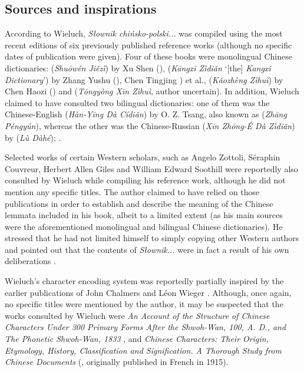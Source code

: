 \documentclass[output=paper,colorlinks,citecolor=brown,arabicfont,chinesefont]{langscibook}
\begin{document}
\subsection{Sources and inspirations}

According to Wieluch, \emph{Słownik chińsko-polski...} was compiled using the most recent editions of six previously published reference works (although no specific dates of publication were given). Four of these books were monolingual Chinese dictionaries: {} (\emph{Shuōwén Jiězì}) by Xu Shen ({}), {} (\emph{Kāngxī Zìdiǎn} ‘[the] \emph{Kangxi Dictionary}’) by Zhang Yushu ({}), Chen Tingjing {}) et al., {} (\emph{Kǎozhèng Zìhuì}) by Chen Haozi ({}) and {} (\emph{Tōngyòng Xīn Zìhuì}, author uncertain). In addition, Wieluch claimed to have consulted two bilingual dictionaries: one of them was the Chinese-English {} (\emph{Hàn-Yīng Dà Cídiǎn}) by O. Z. Tsang, also known as {} (\emph{Zhāng Péngyún}), whereas the other was the Chinese-Russian {} (\emph{Xīn Zhōng-É Dà Zìdiǎn}) by {} (\emph{Lù Dàhé}); \citep[14\textsubscript{p}]{Wieluch1936}.

Selected works of certain Western scholars, such as Angelo Zottoli, Séraphin Couvreur, Herbert Allen Giles and William Edward Soothill were reportedly also consulted by Wieluch while compiling his reference work, although he did not mention any specific titles. The author claimed to have relied on those publications in order to establish and describe the meaning of the Chinese lemmata included in his book, albeit to a limited extent (as his main sources were the aforementioned monolingual and bilingual Chinese dictionaries). He stressed that he had not limited himself to simply copying other Western authors and pointed out that the contents of \emph{Słownik...} were in fact a result of his own deliberations \citep[11\textsubscript{p}]{Wieluch1936}.

Wieluch's character encoding system was reportedly partially inspired by the earlier publications of John Chalmers and Léon Wieger \citep[1\textsubscript{p}]{Wieluch1936}. Although, once again, no specific titles were mentioned by the author, it may be suspected that the works consulted by Wieluch were \emph{An Account of the Structure of Chinese Characters Under 300 Primary Forms After the Shwoh-Wan, 100, A. D., and The Phonetic Shwoh-Wan, 1833} \citep{Chalmers1882}, and \emph{Chinese Characters: Their Origin, Etymology, History, Classification and Signification. A Thorough Study from Chinese Documents} (\citealt{Wieger1965}, originally published in French in 1915).
\end{document}
